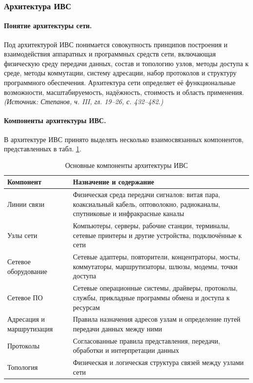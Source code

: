 \documentclass[a4paper,12pt]{article}
\begin{document}
\subsubsection{Архитектура ИВС}

\paragraph{Понятие архитектуры сети.}
Под архитектурой ИВС понимается совокупность принципов построения и взаимодействия аппаратных и программных средств сети, включающая физическую среду передачи данных, состав и топологию узлов, методы доступа к среде, методы коммутации, систему адресации, набор протоколов и структуру программного обеспечения. Архитектура сети определяет её функциональные возможности, масштабируемость, надёжность, стоимость и область применения.
\textit{(Источник: Степанов, ч. III, гл. 19–26, с. 432–482.)}

\paragraph{Компоненты архитектуры ИВС.}
В архитектуре ИВС принято выделять несколько взаимосвязанных компонентов, представленных в табл. \ref{tab:ivs-components}.

\begin{table}[h]
\centering
\caption{Основные компоненты архитектуры ИВС}
\label{tab:ivs-components}
\begin{tabular}{p{3.2cm}p{10.2cm}}
\toprule
\textbf{Компонент} & \textbf{Назначение и содержание} \\
\midrule
Линии связи & Физическая среда передачи сигналов: витая пара, коаксиальный кабель, оптоволокно, радиоканалы, спутниковые и инфракрасные каналы \\
Узлы сети & Компьютеры, серверы, рабочие станции, терминалы, сетевые принтеры и другие устройства, подключённые к сети \\
Сетевое оборудование & Сетевые адаптеры, повторители, концентраторы, мосты, коммутаторы, маршрутизаторы, шлюзы, модемы, точки доступа \\
Сетевое ПО & Сетевые операционные системы, драйверы, протоколы, службы, прикладные программы обмена и доступа к ресурсам \\
Адресация и маршрутизация & Правила назначения адресов узлам и определение путей передачи данных между ними \\
Протоколы & Согласованные правила представления, передачи, обработки и интерпретации данных \\
Топология & Физическая и логическая структура связей между узлами сети \\
\bottomrule
\end{tabular}
\end{table}
\end{document}
